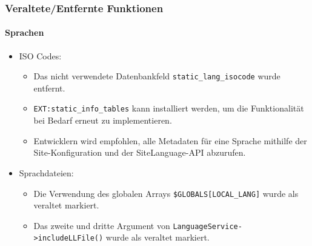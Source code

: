 \begin{frame}[fragile]
	\frametitle{Veraltete/Entfernte Funktionen}
	\framesubtitle{Sprachen}

	\begin{itemize}
		\item ISO Codes:

			\begin{itemize}
				\item Das nicht verwendete Datenbankfeld \texttt{static\_lang\_isocode} wurde entfernt.
				\item \texttt{EXT:static\_info\_tables} kann installiert werden, um die Funktionalität bei Bedarf erneut zu implementieren.
				\item Entwicklern wird empfohlen, alle Metadaten für eine Sprache mithilfe der Site-Konfiguration und der SiteLanguage-API abzurufen.
			\end{itemize}

		\item Sprachdateien:

			\begin{itemize}
				\item Die Verwendung des globalen Arrays \texttt{\$GLOBALS[LOCAL\_LANG]} wurde als veraltet markiert.
				\item Das zweite und dritte Argument von \texttt{LanguageService->includeLLFile()} wurde als veraltet markiert.
			\end{itemize}

	\end{itemize}

\end{frame}


